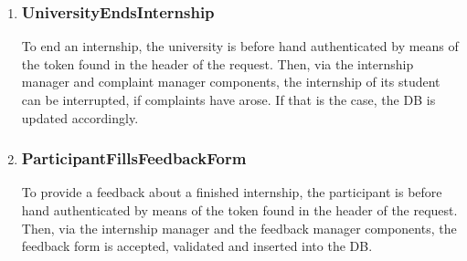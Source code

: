 \begin{enumerate}[label=\textbf{RV\arabic* -}]
\item \subsubsection{UniversityEndsInternship}

To end an internship, the university is before hand authenticated by means of the token found in the header of the request.
Then, via the internship manager and complaint manager components, the internship of its student can be interrupted, if complaints have arose.
If that is the case, the DB is updated accordingly.

\begin{figure}[H]
    \centering
\end{figure}

\item \subsubsection{ParticipantFillsFeedbackForm}

To provide a feedback about a finished internship, the participant is before hand authenticated by means of the token found in the header of the request.
Then, via the internship manager and the feedback manager components, the feedback form is accepted, validated and inserted into the DB.

\begin{figure}[H]
    \centering
\end{figure}

\end{enumerate}

